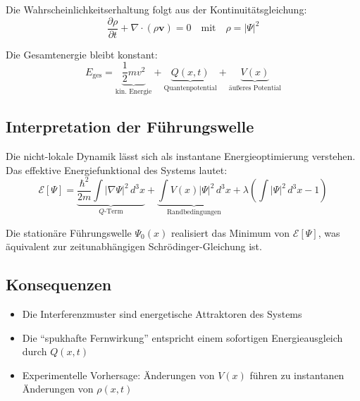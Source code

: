 Die Wahrscheinlichkeitserhaltung folgt aus der Kontinuitätsgleichung:
\[ \frac{\partial\rho}{\partial t} + \nabla\cdot(\rho\mathbf{v}) = 0 \quad \text{mit} \quad \rho = |\Psi|^2 \]

Die Gesamtenergie bleibt konstant:
\[ E_{\text{ges}} = \underbrace{\frac{1}{2}mv^2}_{\text{kin. Energie}} + \underbrace{Q(x,t)}_{\text{Quantenpotential}} + \underbrace{V(x)}_{\text{äußeres Potential}} \]

\subsection{Interpretation der Führungswelle}

Die nicht-lokale Dynamik lässt sich als instantane Energieoptimierung verstehen. Das effektive Energiefunktional des Systems lautet:
\[ \mathcal{E}[\Psi] = \underbrace{\frac{\hbar^2}{2m}\int|\nabla\Psi|^2\,d^3x}_{Q\text{-Term}} + \underbrace{\int V(x)|\Psi|^2\,d^3x}_{\text{Randbedingungen}} + \lambda\left(\int|\Psi|^2\,d^3x - 1\right) \]

Die stationäre Führungswelle $\Psi_0(x)$ realisiert das Minimum von $\mathcal{E}[\Psi]$, was äquivalent zur zeitunabhängigen Schrödinger-Gleichung ist.

\subsection{Konsequenzen}

\begin{itemize}
\item Die Interferenzmuster sind energetische Attraktoren des Systems
\item Die \enquote{spukhafte Fernwirkung} entspricht einem sofortigen Energieausgleich durch $Q(x,t)$
\item Experimentelle Vorhersage: Änderungen von $V(x)$ führen zu instantanen Änderungen von $\rho(x,t)$
\end{itemize}
